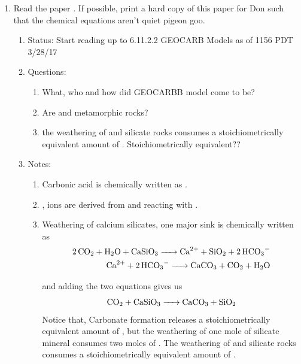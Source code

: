 \documentclass[final,10pt,reqno,twoside]{article}
\begin{document}
\begin{enumerate}[leftmargin=0cm, align=left]
    \item Read the paper . If possible, print a hard copy of this paper for Don such that the chemical equations aren't quiet pigeon goo. 
         \begin{enumerate}[label=\textbf{(\alph*})]
           \item Status: Start reading up to 6.11.2.2 GEOCARB Models as of 1156 PDT 3/28/17
           \item Questions:
          	\begin{enumerate} 
          		\item What, who and how did GEOCARBB model come to be?         
          		\item Are  and  metamorphic rocks?
          		\item the weathering of  and  silicate rocks consumes a stoichiometrically equivalent amount of . Stoichiometrically equivalent??
         	\end{enumerate}
         	\item Notes:
         	\begin{enumerate}
         		\item Carbonic acid is chemically written as . 
         		\item {},  ions are derived from  and  reacting with .
         		\item Weathering of calcium silicates, one major  sink is chemically written as \\
         		   \begin{eqnarray}
         		        \ce{2CO2 + H2O + CaSiO3 -> Ca^{2+} + SiO2 + 2HCO3^-} \\
         		        \ce{Ca^{2+} + 2HCO3^- -> CaCO3 + CO2 + H2O} 
         		   \end{eqnarray}
         		   
         		   and adding the two equations gives us
         		   \begin{equation}
         		   		\ce{CO2 + CaSiO3 -> CaCO3 + SiO2}
         		   \end{equation}
         		   Notice that, Carbonate formation releases a stoichiometrically equivalent amount of  , but the weathering of one mole of silicate mineral consumes two moles of . The weathering of  and  silicate rocks consumes a stoichiometrically equivalent amount of .
         		   

\end{enumerate}
\end{enumerate}
\end{enumerate}
\end{document}
